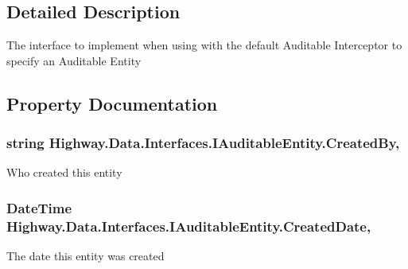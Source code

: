\subsection{Detailed Description}
The interface to implement when using with the default Auditable Interceptor to specify an Auditable Entity 



\subsection{Property Documentation}
\hypertarget{interface_highway_1_1_data_1_1_interfaces_1_1_i_auditable_entity_a0d61b38cdb0d857f95a648d74d47dc4e}{
\subsubsection[{Created\-By}]{\setlength{\rightskip}{0pt plus 5cm}string Highway.\-Data.\-Interfaces.\-I\-Auditable\-Entity.\-Created\-By\hspace{0.3cm}{\ttfamily [get]}, {\ttfamily [set]}}}\label{interface_highway_1_1_data_1_1_interfaces_1_1_i_auditable_entity_a0d61b38cdb0d857f95a648d74d47dc4e}


Who created this entity 

\hypertarget{interface_highway_1_1_data_1_1_interfaces_1_1_i_auditable_entity_a24e61a7fc1bd175a00cb7dd54e44d193}{
\subsubsection[{Created\-Date}]{\setlength{\rightskip}{0pt plus 5cm}Date\-Time Highway.\-Data.\-Interfaces.\-I\-Auditable\-Entity.\-Created\-Date\hspace{0.3cm}{\ttfamily [get]}, {\ttfamily [set]}}}\label{interface_highway_1_1_data_1_1_interfaces_1_1_i_auditable_entity_a24e61a7fc1bd175a00cb7dd54e44d193}


The date this entity was created 

